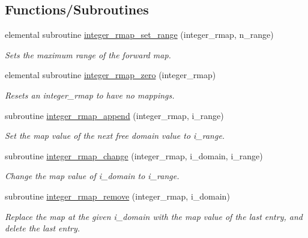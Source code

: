 \subsection*{Functions/\+Subroutines}
\begin{DoxyCompactItemize}
\item 
elemental subroutine \mbox{\hyperlink{namespacepmc__integer__rmap_a8e55a1b6d41e1cec7c05c2f2f89e2603}{integer\+\_\+rmap\+\_\+set\+\_\+range}} (integer\+\_\+rmap, n\+\_\+range)
\begin{DoxyCompactList}\small\item\em Sets the maximum range of the forward map. \end{DoxyCompactList}\item 
elemental subroutine \mbox{\hyperlink{namespacepmc__integer__rmap_a16f57781b90da0777f54a2070b3f4bc4}{integer\+\_\+rmap\+\_\+zero}} (integer\+\_\+rmap)
\begin{DoxyCompactList}\small\item\em Resets an integer\+\_\+rmap to have no mappings. \end{DoxyCompactList}\item 
subroutine \mbox{\hyperlink{namespacepmc__integer__rmap_a0f7f546f381ee5750d589783bb7e1d89}{integer\+\_\+rmap\+\_\+append}} (integer\+\_\+rmap, i\+\_\+range)
\begin{DoxyCompactList}\small\item\em Set the map value of the next free domain value to {\ttfamily i\+\_\+range}. \end{DoxyCompactList}\item 
subroutine \mbox{\hyperlink{namespacepmc__integer__rmap_aab0f22157b45282c06a9c96132755c36}{integer\+\_\+rmap\+\_\+change}} (integer\+\_\+rmap, i\+\_\+domain, i\+\_\+range)
\begin{DoxyCompactList}\small\item\em Change the map value of {\ttfamily i\+\_\+domain} to {\ttfamily i\+\_\+range}. \end{DoxyCompactList}\item 
subroutine \mbox{\hyperlink{namespacepmc__integer__rmap_a01351bbea0a74eb2a4b0f970cbb4ae85}{integer\+\_\+rmap\+\_\+remove}} (integer\+\_\+rmap, i\+\_\+domain)
\begin{DoxyCompactList}\small\item\em Replace the map at the given {\ttfamily i\+\_\+domain} with the map value of the last entry, and delete the last entry. \end{DoxyCompactList}\item 

\end{DoxyCompactItemize}
